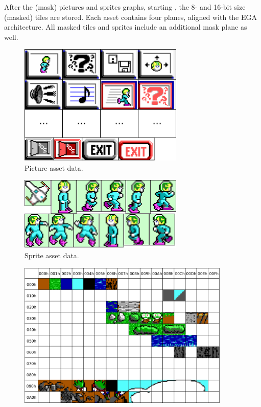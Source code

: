 \documentclass[book.tex]{subfiles}
\begin{document}
\par
After the (mask) pictures and sprites graphs, starting , the 8- and 16-bit size (masked) tiles are stored. Each asset contains four planes, aligned with the EGA architecture. All masked tiles and sprites include an additional mask plane as well.
 
\begin{figure}[H] 
  \centering 
  \includegraphics[width=0.7\textwidth, frame]{screenshots_300dpi/pics_assets.png}
  \caption{Picture asset data.}
  \label{fig:picture_assets}
\end{figure} 

\begin{figure}[H] 
  \centering 
  \includegraphics[width=0.7\textwidth, frame]{screenshots_300dpi/sprite_assets.png}
  \caption{Sprite asset data.}
  \label{fig:sprite_assets}
\end{figure} 

\pagebreak
\begin{figure}[H] 
  \centering 
  \includegraphics[width=0.9\textwidth, frame]{screenshots_300dpi/tile16_assets.png}
\end{figure}  
\end{document}
